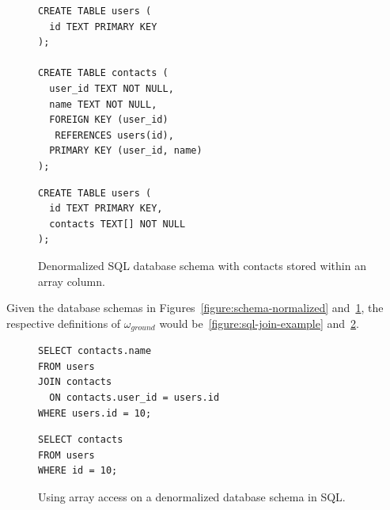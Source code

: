 \begin{figure}[ht]
  \vspace{1em}
  \hfill
  \begin{minipage}[b]{0.40\linewidth}
    \begin{verbatim}
CREATE TABLE users (
  id TEXT PRIMARY KEY
);

CREATE TABLE contacts (
  user_id TEXT NOT NULL,
  name TEXT NOT NULL,
  FOREIGN KEY (user_id) 
   REFERENCES users(id),
  PRIMARY KEY (user_id, name)
);
    \end{verbatim}
    \caption{Normalized SQL database schema with separate tables for users and contacts.}
    \label{figure:schema-normalized}
  \end{minipage}
  \hfill
  \begin{minipage}[b]{0.4\linewidth}
    \begin{verbatim}
CREATE TABLE users (
  id TEXT PRIMARY KEY,
  contacts TEXT[] NOT NULL
);
    \end{verbatim}
    \vspace{3.75em}
    \caption{Denormalized SQL database schema with contacts stored within an array column.}
    \label{figure:schema-denormalized}
  \end{minipage}
  \hfill
  \vspace{1em}
\end{figure}

Given the database schemas in Figures~\ref{figure:schema-normalized}
and~\ref{figure:schema-denormalized}, the respective definitions of
$\omega_{ground}$ would be~\ref{figure:sql-join-example}
and~\ref{figure:sql-array-example}.

\begin{figure}[ht]
  \vspace{1em}
  \hfill
  \begin{minipage}[b]{0.4\linewidth}
    \begin{verbatim}
SELECT contacts.name
FROM users
JOIN contacts
  ON contacts.user_id = users.id
WHERE users.id = 10;
    \end{verbatim}
    \caption{Using JOIN on a normalized database schema in SQL.}
    \label{figure:sql-join-example}
  \end{minipage}
  \hfill
  \begin{minipage}[b]{0.4\linewidth}
    \centering
    \begin{verbatim}
SELECT contacts
FROM users
WHERE id = 10;
    \end{verbatim}
    \vspace{1.3em}
    \caption{Using array access on a denormalized database schema in SQL.}
    \label{figure:sql-array-example}
  \end{minipage}
  \hfill
  \vspace{1em}
\end{figure}


